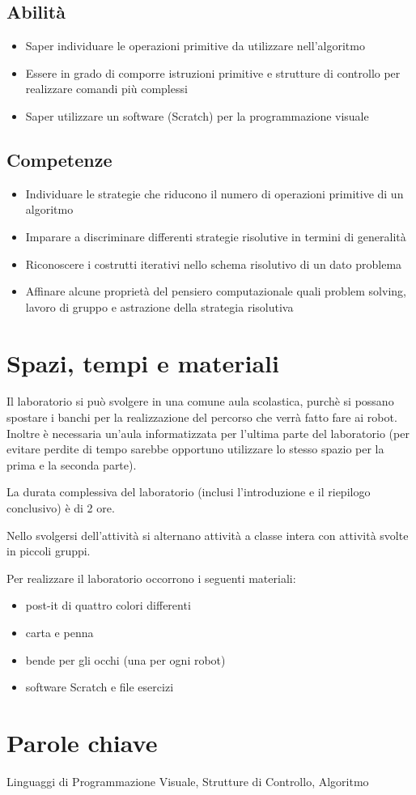 \documentclass[12pt]{article}
\begin{document}
\subsection{Abilità}
\begin{itemize}
\item Saper individuare le operazioni primitive da utilizzare nell’algoritmo
\item Essere in grado di comporre istruzioni primitive e strutture di controllo per realizzare comandi più complessi
\item Saper utilizzare un software (Scratch) per la programmazione visuale
\end{itemize}

\subsection{Competenze}
\begin{itemize}
\item Individuare le strategie che riducono il numero di operazioni primitive di un algoritmo
\item Imparare a discriminare differenti strategie risolutive in termini di generalità
\item Riconoscere i costrutti iterativi nello schema risolutivo di un dato problema
\item Affinare alcune proprietà del pensiero computazionale quali problem solving, lavoro di gruppo e astrazione della strategia risolutiva
\end{itemize}
%
%
\section{Spazi, tempi e materiali}
Il laboratorio si può svolgere in una comune aula scolastica, purchè si possano spostare i banchi per la realizzazione del percorso che verrà fatto fare ai robot. Inoltre è necessaria un'aula informatizzata per l'ultima parte del laboratorio (per evitare perdite di tempo sarebbe opportuno utilizzare lo stesso spazio per la prima e la seconda parte).

La durata complessiva del laboratorio (inclusi l'introduzione e il riepilogo conclusivo) è di 2 ore.

Nello svolgersi dell'attività si alternano attività a classe intera con attività svolte in piccoli gruppi.

Per realizzare il laboratorio occorrono i seguenti materiali:
\begin{itemize}
\item post-it di quattro colori differenti
\item carta e penna
\item bende per gli occhi (una per ogni robot)
\item software Scratch e file esercizi
\end{itemize}
%
%
\section{Parole chiave}
Linguaggi di Programmazione Visuale, Strutture di Controllo, Algoritmo
%
% 
\end{document}
